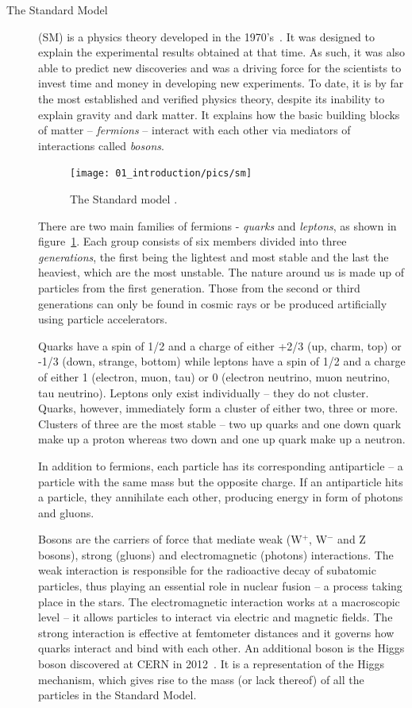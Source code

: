 \begin{description}
\item[The Standard Model]
(SM) is a physics theory developed in the 1970's~\cite{Novaes:1999yn}. It was designed to explain the experimental results obtained at that time. As such, it was also able to predict new discoveries and was a driving force for the scientists to invest time and money in developing new experiments. To date, it is by far the most established and verified physics theory, despite its inability to explain gravity and dark matter. It explains how the basic building blocks of matter -- \emph{fermions} -- interact with each other via mediators of interactions called \emph{bosons}.  
\begin{figure}[!t]
\centering
\texttt{[image: 01\_introduction/pics/sm]}
\caption{The Standard model \cite{Dominguez:2002395}.}
\label{fig:sm1}
\end{figure}
There are two main families of fermions - \emph{quarks} and \emph{leptons}, as shown in figure~\ref{fig:sm1}. Each group consists of six members divided into three \emph{generations}, the first being the lightest and most stable and the last the heaviest, which are the most unstable. The nature around us is made up of particles from the first generation. Those from the second or third generations can only be found in cosmic rays or be produced artificially using particle accelerators.

Quarks have a spin of 1/2 and a charge of either +2/3 (up, charm, top)  or -1/3  (down, strange, bottom) while leptons have a spin of 1/2  and a charge of either 1 (electron, muon, tau) or 0 (electron neutrino, muon neutrino, tau neutrino). Leptons only exist individually -- they do not cluster. Quarks, however, immediately form a cluster of either two, three or more. Clusters of three are the most stable -- two up quarks and one down quark make up a proton whereas two down and one up quark make up a neutron.

In addition to fermions, each particle has its corresponding antiparticle -- a particle with the same mass but the opposite charge. If an antiparticle hits a particle, they annihilate each other, producing energy in form of photons and gluons. 

Bosons are the carriers of force that mediate weak (W$^+$, W$^-$ and Z bosons), strong (gluons) and electromagnetic (photons) interactions. The weak interaction is responsible for the radioactive decay of subatomic particles, thus playing an essential role in nuclear fusion -- a process taking place in the stars. The electromagnetic interaction works at a macroscopic level -- it allows particles to interact via electric and magnetic fields. The strong interaction is effective at femtometer distances and it governs how quarks interact and bind with each other. An additional boson is the Higgs boson discovered at CERN in 2012~\cite{Rossi:2026222}. It is a representation of the Higgs mechanism, which gives rise to the mass (or lack thereof) of all the particles in the Standard Model.
\end{description}

